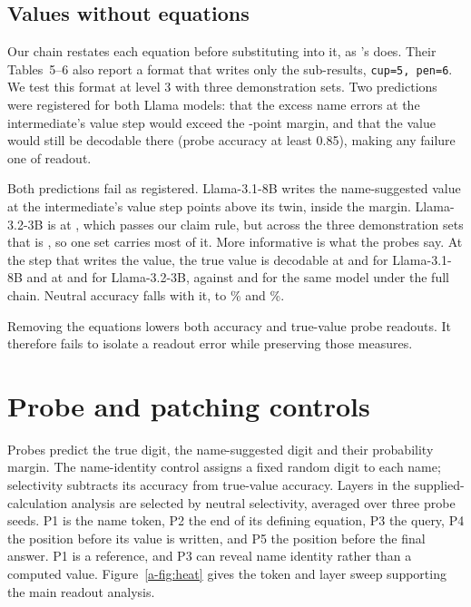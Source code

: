 \subsection{Values without equations}

\label{a-app:simple}

Our chain restates each equation before substituting into it, as
\citeauthor{kudo2026faithful}'s does. Their Tables~5--6 also report a format that writes only the
sub-results, \texttt{cup=5, pen=6}. We test this format
at level 3 with three demonstration sets. Two predictions were registered for both Llama models: that
the excess name errors at the intermediate's value step would exceed the -point
margin, and that the value would still be decodable there (probe accuracy at least 0.85), making
any failure one of readout.

Both predictions fail as registered. Llama-3.1-8B writes the name-suggested value at the intermediate's value
step  points above its twin, inside the margin. Llama-3.2-3B is at
, which passes our claim rule, but across the three demonstration sets that
is , so one set carries most of it. More informative is what the probes say. At
the step that writes the value, the true value is decodable at 
and  for Llama-3.1-8B and at
 and  for Llama-3.2-3B, against
 and  for the same model under the full
chain. Neutral accuracy falls with it, to \% and \%.

Removing the equations lowers both accuracy and true-value probe readouts. It therefore fails to isolate a readout error while preserving those measures.

\section{Probe and patching controls}
\label{a-app:sweeps}
\label{a-app:figs}



Probes predict the true digit, the name-suggested digit and their probability margin.
The name-identity control assigns a fixed random digit to each name; selectivity subtracts
its accuracy from true-value accuracy. Layers in the supplied-calculation analysis are
selected by neutral selectivity, averaged over three probe seeds.
P1 is the name token, P2 the end of its defining equation, P3 the query,
P4 the position before its value is written, and P5 the position before the final answer.
P1 is a reference, and P3 can reveal name identity rather than a computed value.
Figure~\ref{a-fig:heat} gives the token and layer sweep supporting the main readout analysis.

